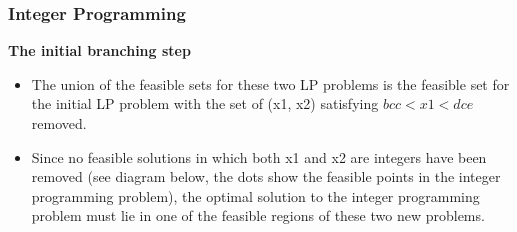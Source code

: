 \documentclass{beamer}
\begin{document}
\begin{frame} 
\frametitle{Integer Programming}     
\noindent \textbf{The initial branching step}
\begin{itemize}
\item The union of the feasible sets for these two LP problems is the
feasible set for the initial LP problem with the set of (x1, x2)
satisfying $bcc < x1 < dce$ removed.
\item Since no feasible solutions in which both x1 and x2 are integers
have been removed (see diagram below, the dots show the feasible
points in the integer programming problem), the optimal solution
to the integer programming problem must lie in one of the feasible
regions of these two new problems.
\end{itemize} 
\end{frame}  
\end{document}
